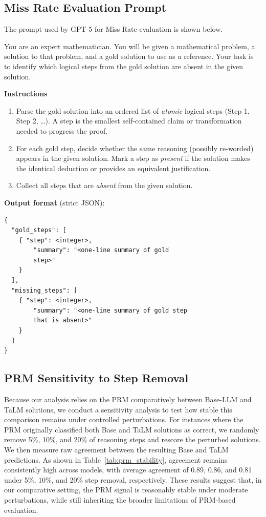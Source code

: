 \documentclass[11pt]{article}
\begin{document}
\subsection{Miss Rate Evaluation Prompt}
\label{appendix:missrate_prompt}
The prompt used by GPT-5 for Miss Rate evaluation is shown below.

\begin{prompt}[title={\footnotesize\texttt{Miss Rate Evaluation Prompt}}, label=prompt:missing_steps]
You are an expert mathematician. You will be given a mathematical problem, a solution to that problem, and a gold solution to use as a reference. Your task is to identify which logical steps from the gold solution are absent in the given solution.

\textbf{Instructions}
\begin{enumerate}
    \item Parse the gold solution into an ordered list of \emph{atomic} logical steps (Step 1, Step 2, \dots). A step is the smallest self-contained claim or transformation needed to progress the proof.
    \item For each gold step, decide whether the same reasoning (possibly re-worded) appears in the given solution. Mark a step as \emph{present} if the solution makes the identical deduction or provides an equivalent justification.
    \item Collect all steps that are \emph{absent} from the given solution.
\end{enumerate}

\textbf{Output format} (strict JSON):
\begin{verbatim}
{
  "gold_steps": [
    { "step": <integer>, 
        "summary": "<one-line summary of gold
        step>" 
    }
  ],
  "missing_steps": [
    { "step": <integer>, 
        "summary": "<one-line summary of gold step
        that is absent>"
    }
  ]
}
\end{verbatim}
\end{prompt}

\subsection{PRM Sensitivity to Step Removal}
\label{appendix:prm_stability}
Because our analysis relies on the PRM comparatively between Base-LLM and TaLM solutions, we conduct a sensitivity analysis to test how stable this comparison remains under controlled perturbations. For instances where the PRM originally classified both Base and TaLM solutions as correct, we randomly remove 5\%, 10\%, and 20\% of reasoning steps and rescore the perturbed solutions. We then measure raw agreement between the resulting Base and TaLM predictions. As shown in Table~\ref{tab:prm_stability}, agreement remains consistently high across models, with average agreement of 0.89, 0.86, and 0.81 under 5\%, 10\%, and 20\% step removal, respectively. These results suggest that, in our comparative setting, the PRM signal is reasonably stable under moderate perturbations, while still inheriting the broader limitations of PRM-based evaluation.
\end{document}
